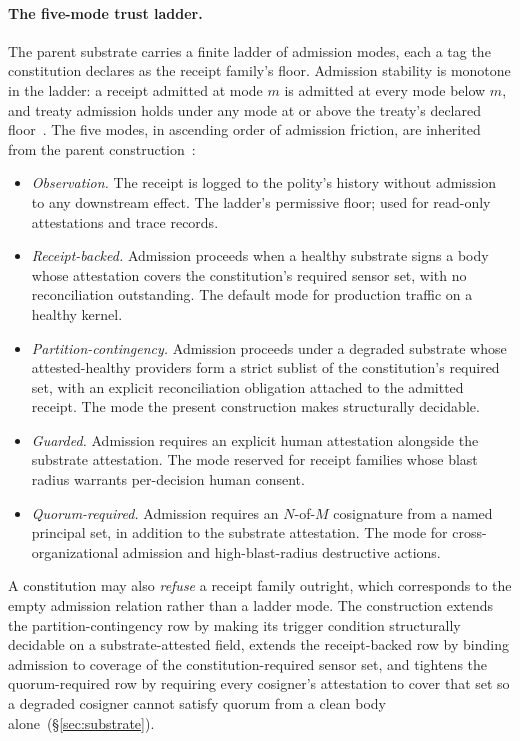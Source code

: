 \paragraph{The five-mode trust ladder.}
The parent substrate carries a finite ladder of admission modes, each a tag the constitution declares as the receipt family's floor. Admission stability is monotone in the ladder: a receipt admitted at mode $m$ is admitted at every mode below $m$, and treaty admission holds under any mode at or above the treaty's declared floor~. The five modes, in ascending order of admission friction, are inherited from the parent construction~\cite{chioProgrammableSovereignty2027}:
\begin{itemize}
  \item \emph{Observation.} The receipt is logged to the polity's history without admission to any downstream effect. The ladder's permissive floor; used for read-only attestations and trace records.
  \item \emph{Receipt-backed.} Admission proceeds when a healthy substrate signs a body whose attestation covers the constitution's required sensor set, with no reconciliation outstanding. The default mode for production traffic on a healthy kernel.
  \item \emph{Partition-contingency.} Admission proceeds under a degraded substrate whose attested-healthy providers form a strict sublist of the constitution's required set, with an explicit reconciliation obligation attached to the admitted receipt. The mode the present construction makes structurally decidable.
  \item \emph{Guarded.} Admission requires an explicit human attestation alongside the substrate attestation. The mode reserved for receipt families whose blast radius warrants per-decision human consent.
  \item \emph{Quorum-required.} Admission requires an $N$-of-$M$ cosignature from a named principal set, in addition to the substrate attestation. The mode for cross-organizational admission and high-blast-radius destructive actions.
\end{itemize}
A constitution may also \emph{refuse} a receipt family outright, which corresponds to the empty admission relation rather than a ladder mode. The construction extends the partition-contingency row by making its trigger condition structurally decidable on a substrate-attested field, extends the receipt-backed row by binding admission to coverage of the constitution-required sensor set, and tightens the quorum-required row by requiring every cosigner's attestation to cover that set so a degraded cosigner cannot satisfy quorum from a clean body alone~(\S\ref{sec:substrate}).

